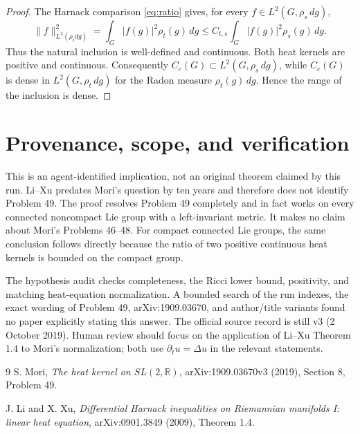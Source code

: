 \documentclass[11pt]{article}
\newcommand{\Ltwo}[1]{L^2\!\left(G,#1\,dg\right)}
\begin{document}
\begin{proof}
The Harnack comparison \eqref{eq:ratio} gives, for every $f\in\Ltwo{\rho_s}$,
\[
 \|f\|_{L^2(\rho_tdg)}^2
 =\int_G|f(g)|^2\rho_t(g)\,dg
 \le C_{t,s}\int_G|f(g)|^2\rho_s(g)\,dg.
\]
Thus the natural inclusion is well-defined and continuous. Both heat kernels
are positive and continuous. Consequently $C_c(G)\subset\Ltwo{\rho_s}$,
while $C_c(G)$ is dense in $\Ltwo{\rho_t}$ for the Radon measure
$\rho_t(g)\,dg$. Hence the range of the inclusion is dense.
\end{proof}

\section*{Provenance, scope, and verification}

This is an agent-identified implication, not an original theorem claimed by
this run. Li--Xu predates Mori's question by ten years and therefore does not
identify Problem 49. The proof resolves Problem 49 completely and in fact
works on every connected noncompact Lie group with a left-invariant metric.
It makes no claim about Mori's Problems 46--48. For compact connected Lie
groups, the same conclusion follows directly because the ratio of two
positive continuous heat kernels is bounded on the compact group.

The hypothesis audit checks completeness, the Ricci lower bound, positivity,
and matching heat-equation normalization. A bounded search of the run indexes,
the exact wording of Problem 49, arXiv:1909.03670, and author/title variants
found no paper explicitly stating this answer. The official source record is
still v3 (2 October 2019). Human review should focus on the application of
Li--Xu Theorem 1.4 to Mori's normalization; both use
$\partial_tu=\Delta u$ in the relevant statements.

\begin{thebibliography}{9}
S. Mori, \emph{The heat kernel on $SL(2,\mathbb R)$}, arXiv:1909.03670v3
(2019), Section 8, Problem 49.

J. Li and X. Xu, \emph{Differential Harnack inequalities on Riemannian
manifolds I: linear heat equation}, arXiv:0901.3849 (2009), Theorem 1.4.
\end{thebibliography}
\end{document}
